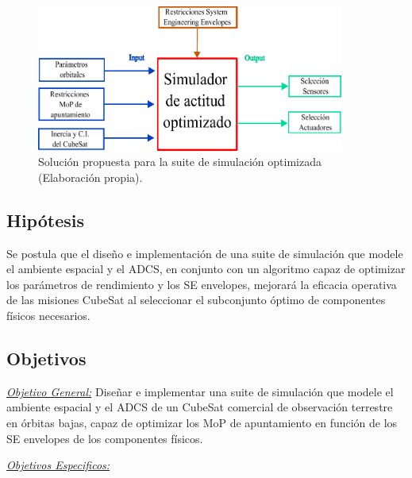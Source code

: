 \begin{figure}[h]
	\centering    
	\includegraphics[width=0.9\textwidth]{bloque02.pdf}
	\caption{Solución propuesta para la suite de simulación optimizada (Elaboración propia).}
	\label{fig:bloques02}
\end{figure}

\subsection{Hipótesis}
Se postula que el diseño e implementación de una suite de simulación que modele el ambiente espacial y el ADCS, en conjunto con un algoritmo capaz de optimizar los parámetros de rendimiento y los SE envelopes, mejorará la eficacia operativa de las misiones CubeSat al seleccionar el subconjunto óptimo de componentes físicos necesarios.

\subsection{Objetivos}
\textit{\underline{Objetivo General:}} Diseñar e implementar una suite de simulación que modele el ambiente espacial y el ADCS de un CubeSat comercial de observación terrestre en órbitas bajas, capaz de optimizar los MoP de apuntamiento en función de los SE envelopes de los componentes físicos.

\textit{\underline{Objetivos Especificos:}}

